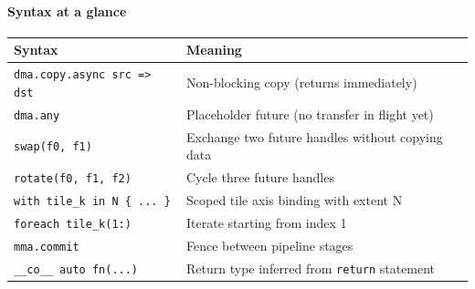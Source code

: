 \paragraph*{Syntax at a glance}

\begin{table}[htbp]
\centering\small
\begin{tabularx}{\linewidth}{@{}lX@{}}
\toprule
\textbf{Syntax} & \textbf{Meaning} \\
\midrule
\texttt{dma.\allowbreak{}copy.\allowbreak{}async src =\textgreater{} dst} & Non-blocking copy (returns immediately) \\
\texttt{dma.any} & Placeholder future (no transfer in flight yet) \\
\texttt{swap(f0, f1)} & Exchange two future handles without copying data \\
\texttt{rotate(f0, f1, f2)} & Cycle three future handles \\
\texttt{with tile\_\allowbreak{}k in N \{ .\allowbreak{}.\allowbreak{}.\allowbreak{} \}} & Scoped tile axis binding with extent N \\
\texttt{foreach tile\_\allowbreak{}k(1:\allowbreak{})} & Iterate starting from index 1 \\
\texttt{mma.commit} & Fence between pipeline stages \\
\texttt{\_\allowbreak{}\_\allowbreak{}co\_\allowbreak{}\_\allowbreak{} auto fn(.\allowbreak{}.\allowbreak{}.\allowbreak{})} & Return type inferred from \texttt{return} statement \\
\bottomrule
\end{tabularx}
\end{table}
